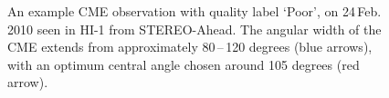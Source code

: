 \documentclass[10pt, a4paper, oneside]{article}
\begin{document}
\begin{figure}[ht]
\caption{An example CME observation with quality label `Poor', on 24\,Feb.\,2010 seen in HI-1 from STEREO-Ahead. The angular width of the CME extends from approximately 80\,--\,120 degrees (blue arrows), with an optimum central angle chosen around 105 degrees (red arrow).}
\label{poor}
\end{figure}
\end{document}
